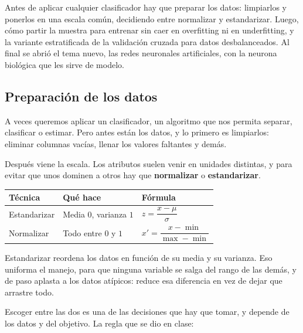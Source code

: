 \documentclass[11pt,letterpaper]{article}
\begin{document}

\begin{quick_sum}
    Antes de aplicar cualquier clasificador hay que preparar los
    datos: limpiarlos y ponerlos en una escala común, decidiendo entre
    normalizar y estandarizar. Luego, cómo partir la muestra para
    entrenar sin caer en overfitting ni en underfitting, y la variante
    estratificada de la validación cruzada para datos desbalanceados.
    Al final se abrió el tema nuevo, las redes neuronales artificiales,
    con la neurona biológica que les sirve de modelo.
\end{quick_sum}

\subsection*{Preparación de los datos}

A veces queremos aplicar un clasificador, un algoritmo que nos permita
separar, clasificar o estimar. Pero antes están los datos, y lo
primero es limpiarlos: eliminar columnas vacías, llenar los valores
faltantes y demás.

Después viene la escala. Los atributos suelen venir en unidades
distintas, y para evitar que unos dominen a otros hay que
\textbf{normalizar} o \textbf{estandarizar}.

\begin{center}
\begin{tabular}{lll}
  \toprule
  \textbf{Técnica} & \textbf{Qué hace} & \textbf{Fórmula} \\
  \midrule
  Estandarizar & Media $0$, varianza $1$
               & $z = \dfrac{x - \mu}{\sigma}$ \\
  \addlinespace
  Normalizar   & Todo entre $0$ y $1$
               & $x' = \dfrac{x - \min}{\max - \min}$ \\
  \bottomrule
\end{tabular}
\end{center}

Estandarizar reordena los datos en función de su media y su varianza.
Eso uniforma el manejo, para que ninguna variable se salga del rango
de las demás, y de paso aplasta a los datos atípicos: reduce esa
diferencia en vez de dejar que arrastre todo.

Escoger entre las dos es una de las decisiones que hay que tomar, y
depende de los datos y del objetivo. La regla que se dio en clase:
\end{document}
